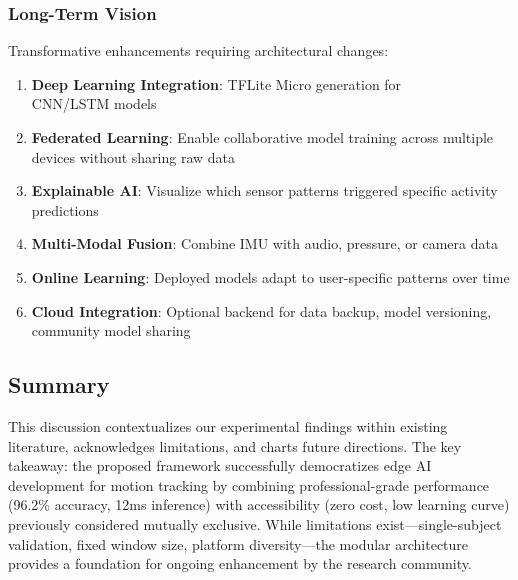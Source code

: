 \subsubsection{Long-Term Vision}
Transformative enhancements requiring architectural changes:
\begin{enumerate}
    \item \textbf{Deep Learning Integration}: TFLite Micro generation for\\CNN/LSTM models
    \item \textbf{Federated Learning}: Enable collaborative model training across multiple devices without sharing raw data
    \item \textbf{Explainable AI}: Visualize which sensor patterns triggered specific activity predictions
    \item \textbf{Multi-Modal Fusion}: Combine IMU with audio, pressure, or camera data
    \item \textbf{Online Learning}: Deployed models adapt to user-specific patterns over time
    \item \textbf{Cloud Integration}: Optional backend for data backup, model versioning, community model sharing
\end{enumerate}

\subsection{Summary}
This discussion contextualizes our experimental findings within existing literature, acknowledges limitations, and charts future directions. The key takeaway: the proposed framework successfully democratizes edge AI development for motion tracking by combining professional-grade performance (96.2\% accuracy, 12ms inference) with accessibility (zero cost, low learning curve) previously considered mutually exclusive. While limitations exist—single-subject validation, fixed window size, platform diversity—the modular architecture provides a foundation for ongoing enhancement by the research community.